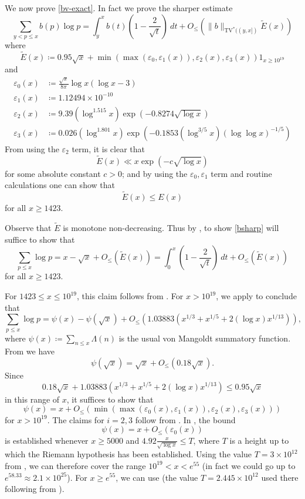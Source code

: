 \documentclass[12pt,a4paper,reqno]{amsart}
\numberwithin{equation}{section}
\theoremstyle{plain}
\theoremstyle{definition}
\newcommand\eps{\varepsilon}
\begin{document}
We now prove \eqref{bv-exact}. In fact we prove the sharper estimate
\begin{equation}\label{bsharp}  
  \sum_{y < p \leq x} b(p) \log p = \int_y^x b(t) \left(1 - \frac{2}{\sqrt{t}}\right) \ dt
+ O_\leq\left(\|b\|_{\mathrm{TV}^*((y,x])} \tilde E(x) \right)
\end{equation}
where
\begin{equation}\label{etil-def}
\tilde E(x) \coloneqq 0.95 \sqrt{x} + \min( \max(\eps_0,\eps_1(x)), \eps_2(x), \eps_3(x)) 1_{x \geq 10^{19}}
\end{equation}
and
\begin{align*}
  \eps_0(x) &\coloneqq \frac{\sqrt{x}}{8\pi} \log x(\log x - 3)\\
  \eps_1(x) &\coloneqq 1.12494 \times 10^{-10}\\
  \eps_2(x) &\coloneqq 9.39 (\log^{1.515} x) \exp(-0.8274\sqrt{\log x})\\
  \eps_3(x) &\coloneqq 0.026 (\log^{1.801} x) \exp(-0.1853 (\log^{3/5} x) (\log\log x)^{-1/5})
\end{align*}
From using the $\eps_2$ term, it is clear that
$$ \tilde E(x) \ll x \exp(-c \sqrt{\log x})$$
for some absolute constant $c>0$; and by using the $\eps_0, \eps_1$ term and routine calculations one can show that 
$$ \tilde E(x) \leq E(x)$$
for all $x \geq 1423$.

Observe that $\tilde E$ is monotone non-decreasing. Thus by , to show \eqref{bsharp} will suffice to show that
$$ \sum_{p \leq x} \log p = x - \sqrt{x} + O_{\leq}(\tilde E(x))
  = \int_0^x \left(1-\frac{2}{\sqrt{t}}\right)\ dt + O_{\leq}(\tilde E(x))$$
for all $x \geq 1423$.

For $1423 \leq x \leq 10^{19}$, this claim follows from \cite[Theorem 2]{buthe-2}.  For $x > 10^{19}$, we apply \cite[(6.10), (6.11)]{buthe} to conclude that
$$
\sum_{p \leq x} \log p = \psi(x) - \psi(\sqrt{x}) + O_{\leq}(1.03883 (x^{1/3} + x^{1/5} + 2 (\log x) x^{1/13})),$$
where $\psi(x) \coloneqq \sum_{n \leq x} 
\Lambda(n)$ is the usual von Mangoldt summatory function.  
From \cite[Theorems 10,12]{rs} we have
$$ \psi(\sqrt{x}) = \sqrt{x} + O_{\leq}(0.18 \sqrt{x}).$$
Since
$$ 0.18 \sqrt{x} + 1.03883 (x^{1/3} + x^{1/5} + 2 (\log x) x^{1/13}) \leq 0.95 \sqrt{x}$$
in this range of $x$, it suffices to show that
$$ \psi(x) = x + O_{\leq}(\min( \max(\eps_0(x),\eps_1(x)), \eps_2(x), \eps_3(x)) )$$
for $x > 10^{19}$.  The claims for $i=2,3$ follow from \cite[Theorems 1.1, 1.4]{johnston-yang}.  In \cite[Theorem 2, (7.3)]{buthe}, the bound
$$ \psi(x) = x + O_{\leq}(\eps_0(x))$$
is established whenever $x \geq 5000$ and $4.92 \frac{x}{\sqrt{\log x}} \leq T$, where $T$ is a height up to which the Riemann hypothesis has been established.  Using the value $T = 3 \times 10^{12}$ from \cite{platt-rh}, we can therefore cover the range $10^{19} < x < e^{55}$ (in fact we could go up to $e^{58.33} \approx 2.1 \times 10^{25}$).  For $x \geq e^{55}$, we can use \cite[Table 2]{buthe} (the value $T = 2.445 \times 10^{12}$ used there following from \cite{platt-rh}).
\end{document}
